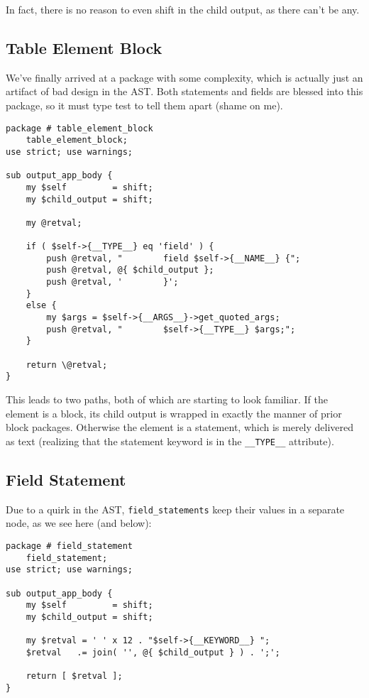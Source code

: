 In fact, there is no reason to even shift in the child output, as there
can't be any.

\subsection*{Table Element Block}

We've finally arrived at a package with some complexity, which is actually
just an artifact of bad design in the AST.  Both statements and fields
are blessed into this package, so it must type test to tell them apart
(shame on me).

\begin{verbatim}
package # table_element_block
    table_element_block;
use strict; use warnings;

sub output_app_body {
    my $self         = shift;
    my $child_output = shift;

    my @retval;

    if ( $self->{__TYPE__} eq 'field' ) {
        push @retval, "        field $self->{__NAME__} {";
        push @retval, @{ $child_output };
        push @retval, '        }';
    }
    else {
        my $args = $self->{__ARGS__}->get_quoted_args;
        push @retval, "        $self->{__TYPE__} $args;";
    }

    return \@retval;
}
\end{verbatim}

This leads to two paths, both of which are starting to look familiar.
If the element is a block, its child output is wrapped in exactly the
manner of prior block packages.  Otherwise the element is a statement,
which is merely delivered as text (realizing that the statement keyword
is in the \verb+__TYPE__+ attribute).

\subsection*{Field Statement}

Due to a quirk in the AST, \verb+field_statements+ keep their values in
a separate node, as we see here (and below):

\begin{verbatim}
package # field_statement
    field_statement;
use strict; use warnings;

sub output_app_body {
    my $self         = shift;
    my $child_output = shift;

    my $retval = ' ' x 12 . "$self->{__KEYWORD__} ";
    $retval   .= join( '', @{ $child_output } ) . ';';

    return [ $retval ];
}
\end{verbatim}


